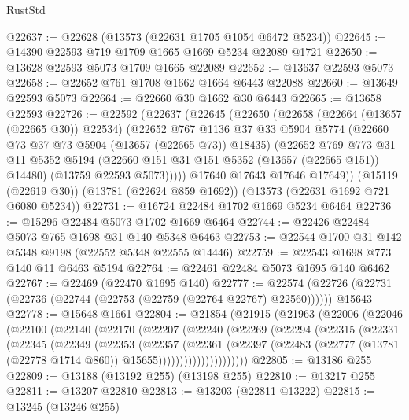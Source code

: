 \begin{lexlean}{RustStd}
\begin{coremodule}
@22637 := @22628 (@13573 (@22631 @1705 @1054 @6472 @5234))
@22645 := @14390 @22593 @719 @1709 @1665 @1669 @5234 @22089 @1721
@22650 := @13628 @22593 @5073 @1709 @1665 @22089
@22652 := @13637 @22593 @5073
@22658 := @22652 @761 @1708 @1662 @1664 @6443 @22088
@22660 := @13649 @22593 @5073
@22664 := @22660 @30 @1662 @30 @6443
@22665 := @13658 @22593
@22726 := @22592
    (@22637
      (@22645
        (@22650
          (@22658
            (@22664 (@13657 (@22665 @30)) @22534)
            (@22652
              @767
              @1136
              @37
              @33
              @5904
              @5774
              (@22660 @73 @37 @73 @5904 (@13657 (@22665 @73)) @18435)
              (@22652
                @769
                @773
                @31
                @11
                @5352
                @5194
                (@22660 @151 @31 @151 @5352 (@13657 (@22665 @151)) @14480)
                (@13759 @22593 @5073)))))
        @17640
        @17643
        @17646
        @17649))
    (@15119 (@22619 @30))
    (@13781 (@22624 @859 @1692))
    (@13573 (@22631 @1692 @721 @6080 @5234))
@22731 := @16724 @22484 @1702 @1669 @5234 @6464
@22736 := @15296 @22484 @5073 @1702 @1669 @6464
@22744 := @22426 @22484 @5073 @765 @1698 @31 @140 @5348 @6463
@22753 := @22544 @1700 @31 @142 @5348 @9198 (@22552 @5348 @22555 @14446)
@22759 := @22543 @1698 @773 @140 @11 @6463 @5194
@22764 := @22461 @22484 @5073 @1695 @140 @6462
@22767 := @22469 (@22470 @1695 @140)
@22777 := @22574 (@22726 (@22731 (@22736 (@22744 (@22753 (@22759 (@22764 @22767) @22560)))))) @15643
@22778 := @15648 @1661
@22804 := @21854
    (@21915
      (@21963
        (@22006
          (@22046
            (@22100
              (@22140
                (@22170
                  (@22207
                    (@22240
                      (@22269
                        (@22294
                          (@22315
                            (@22331
                              (@22345
                                (@22349
                                  (@22353
                                    (@22357
                                      (@22361
                                        (@22397
                                          (@22483
                                            (@22777
                                              (@13781 (@22778 @1714 @860))
                                              @15655)))))))))))))))))))))
@22805 := @13186 @255
@22809 := @13188 (@13192 @255) (@13198 @255)
@22810 := @13217 @255
@22811 := @13207 @22810
@22813 := @13203 (@22811 @13222)
@22815 := @13245 (@13246 @255)

\end{coremodule}
\end{lexlean}
